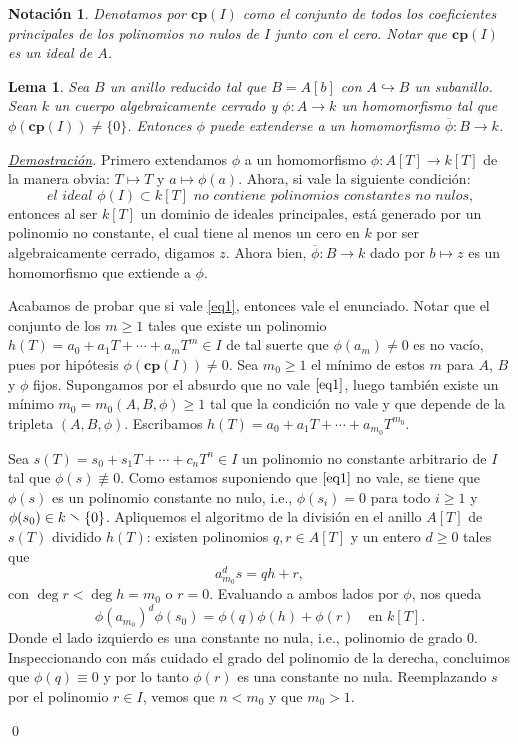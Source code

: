 \documentclass[12pt]{article}
\theoremstyle{customTheorem}
\newtheorem{lemma}[theorem]{Lema}
\theoremstyle{customDefinition}
\newtheorem{notation}[theorem]{Notación}
\renewenvironment{proof}[1][Demostración]{\noindent \textit{\underline{#1}.\hspace{2mm}}}{\hfill\qed}
\renewcommand{\setminus}{\mathrel{\stackon[0.5pt]{}{$\smallsetminus$}}}
\renewcommand{\bar}[1]{\overline{#1}}
\newcommand{\cp}[1]{\textbf{cp}(#1)}
\begin{document}
\begin{notation}
Denotamos por $ \cp I$ como el conjunto de todos los coeficientes principales de los polinomios no nulos de $I$ junto con el cero. Notar que $\cp I$ es un ideal de $A$.
\end{notation}



\begin{lemma}\label{Pre-lema}
    Sea $B$ un anillo reducido tal que $B = A [b]$ con $A \hookrightarrow B$ un subanillo. Sean $k$ un cuerpo algebraicamente cerrado y $\phi : A \to k$ un homomorfismo tal que $\phi (\cp I) \neq \{0\} $. Entonces $\phi$ puede extenderse a un homomorfismo $\bar \phi : B \to k$.
\end{lemma}
\begin{proof}
    Primero extendamos $\phi$ a un homomorfismo $\phi : A[T] \to k[T]$ de la manera obvia: $T \mapsto T$ y $a \mapsto \phi (a)$. Ahora, si vale la siguiente condición:
    \begin{equation}\label{eq1}
        \textit{el ideal $\phi (I) \subset k[T]$ no contiene polinomios constantes no nulos,}\tag{C}
    \end{equation}
    entonces al ser $k[T]$ un dominio de ideales principales, está generado por un polinomio no constante, el cual tiene al menos un cero en $k$ por ser algebraicamente cerrado, digamos $z$. Ahora bien, $\bar \phi : B \to k$ dado por $b \mapsto z$ es un homomorfismo que extiende a $\phi$.

    Acabamos de probar que si vale \eqref{eq1}, entonces vale el enunciado. Notar que el conjunto de los $m \geq 1$ tales que existe un polinomio $h(T) = a_0 + a_1 T + \cdots + a_m T^m \in I$ de tal suerte que $\phi (a_m) \neq 0$ es no vacío, pues por hipótesis $\phi (\cp I) \neq 0$. Sea $m_0 \geq 1$ el mínimo de estos $m$ para $A$, $B$ y $\phi$ fijos. Supongamos por el absurdo que no vale $\eqref{eq1}$, luego también existe un mínimo $m_0 = m_0 (A,B,\phi) \geq 1$ tal que la condición no vale y que depende de la tripleta $(A,B,\phi)$.
    Escribamos $h(T) = a_0 + a_1 T + \cdots + a_{m_0} T^{m_0}$.

    Sea $s(T) = s_0 + s_1 T + \cdots + c_{n} T^n \in I$ un polinomio no constante arbitrario de $I$ tal que $\phi (s) \not \equiv 0$. Como estamos suponiendo que $\eqref{eq1}$ no vale, se tiene que $\phi (s)$ es un polinomio constante no nulo, i.e., $\phi (s_i) = 0$ para todo $i \geq 1$ y $\phi (s_0) \in k \setminus \{0\}$. Apliquemos el algoritmo de la división en el anillo $A[T]$ de $s(T)$ dividido $h(T)$: existen polinomios $q, r \in A[T]$ y un entero $d \geq 0$ tales que
    \[
    a_{m_0}^d s = q h + r,
    \]
    con $\deg r < \deg h = m_0$ o $r = 0$. Evaluando a ambos lados por $\phi$, nos queda
    \[
    \phi (a_{m_0})^d \phi (s_0) = \phi (q) \phi (h) + \phi(r) \quad \text{en } k[T].
    \]
    Donde el lado izquierdo es una constante no nula, i.e., polinomio de grado $0$. Inspeccionando con más cuidado el grado del polinomio de la derecha, concluimos que $\phi (q) \equiv 0$ y por lo tanto $\phi (r)$ es una constante no nula. Reemplazando $s$ por el polinomio $r \in I$, vemos que $n <m_0$ y que $m_0 > 1$.


\end{proof}
\end{document}
